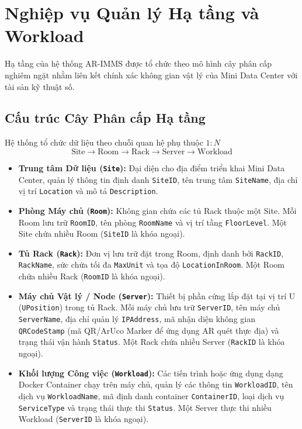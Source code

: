 \section{Nghiệp vụ Quản lý Hạ tầng và Workload}
Hạ tầng của hệ thống AR-IMMS được tổ chức theo mô hình cây phân cấp nghiêm ngặt nhằm liên kết chính xác không gian vật lý của Mini Data Center với tài sản kỹ thuật số.

\subsection{Cấu trúc Cây Phân cấp Hạ tầng}
Hệ thống tổ chức dữ liệu theo chuỗi quan hệ phụ thuộc $1:N$
\begin{equation*}
\text{Site} \longrightarrow \text{Room} \longrightarrow \text{Rack} \longrightarrow \text{Server} \longrightarrow \text{Workload}
\end{equation*}

\begin{itemize}[leftmargin=2em]
    \item \textbf{Trung tâm Dữ liệu (\texttt{Site}):} Đại diện cho địa điểm triển khai Mini Data Center, quản lý thông tin định danh \texttt{SiteID}, tên trung tâm \texttt{SiteName}, địa chỉ vị trí \texttt{Location} và mô tả \texttt{Description}.
    \item \textbf{Phòng Máy chủ (\texttt{Room}):} Không gian chứa các tủ Rack thuộc một Site. Mỗi Room lưu trữ \texttt{RoomID}, tên phòng \texttt{RoomName} và vị trí tầng \texttt{FloorLevel}. Một Site chứa nhiều Room (\texttt{SiteID} là khóa ngoại).
    \item \textbf{Tủ Rack (\texttt{Rack}):} Đơn vị lưu trữ đặt trong Room, định danh bởi \texttt{RackID}, \texttt{RackName}, sức chứa tối đa \texttt{MaxUnit} và tọa độ \texttt{LocationInRoom}. Một Room chứa nhiều Rack (\texttt{RoomID} là khóa ngoại).
    \item \textbf{Máy chủ Vật lý / Node (\texttt{Server}):} Thiết bị phần cứng lắp đặt tại vị trí U (\texttt{UPosition}) trong tủ Rack. Mỗi máy chủ lưu trữ \texttt{ServerID}, tên máy chủ \texttt{ServerName}, địa chỉ quản lý \texttt{IPAddress}, mã nhận diện không gian \texttt{QRCodeStamp} (mã QR/ArUco Marker để ứng dụng AR quét thực địa) và trạng thái vận hành \texttt{Status}. Một Rack chứa nhiều Server (\texttt{RackID} là khóa ngoại).
    \item \textbf{Khối lượng Công việc (\texttt{Workload}):} Các tiến trình hoặc ứng dụng dạng Docker Container chạy trên máy chủ, quản lý các thông tin \texttt{WorkloadID}, tên dịch vụ \texttt{WorkloadName}, mã định danh container \texttt{ContainerID}, loại dịch vụ \texttt{ServiceType} và trạng thái thực thi \texttt{Status}. Một Server thực thi nhiều Workload (\texttt{ServerID} là khóa ngoại).
\end{itemize}

